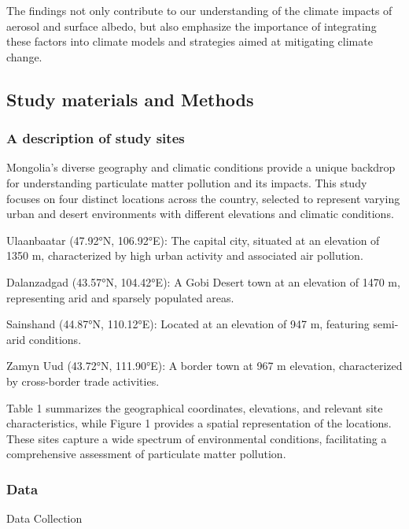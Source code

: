 \documentclass[
  11pt,
]{article}
\begin{document}
The findings not only contribute to our understanding of the climate
impacts of aerosol and surface albedo, but also emphasize the importance
of integrating these factors into climate models and strategies aimed at
mitigating climate change.

\newpage

\subsection{Study materials and
Methods}\label{study-materials-and-methods}

\subsubsection{A description of study
sites}\label{a-description-of-study-sites}

Mongolia's diverse geography and climatic conditions provide a unique
backdrop for understanding particulate matter pollution and its impacts.
This study focuses on four distinct locations across the country,
selected to represent varying urban and desert environments with
different elevations and climatic conditions.

Ulaanbaatar (47.92°N, 106.92°E): The capital city, situated at an
elevation of 1350 m, characterized by high urban activity and associated
air pollution.

Dalanzadgad (43.57°N, 104.42°E): A Gobi Desert town at an elevation of
1470 m, representing arid and sparsely populated areas.

Sainshand (44.87°N, 110.12°E): Located at an elevation of 947 m,
featuring semi-arid conditions.

Zamyn Uud (43.72°N, 111.90°E): A border town at 967 m elevation,
characterized by cross-border trade activities.

Table 1 summarizes the geographical coordinates, elevations, and
relevant site characteristics, while Figure 1 provides a spatial
representation of the locations. These sites capture a wide spectrum of
environmental conditions, facilitating a comprehensive assessment of
particulate matter pollution.

\subsubsection{Data}\label{data}

Data Collection
\end{document}
